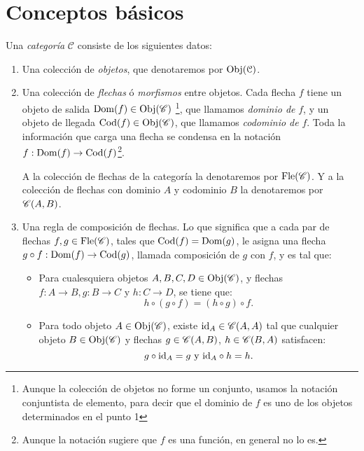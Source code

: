 \documentclass{comunicaciones}
\begin{document}
\section{Conceptos básicos}\label{Conceptos basicos}
\begin{dfn}[Categoría]\label{Definicion categoria}
 Una \emph{categoría} $\mathcal{C}$ consiste de los siguientes datos:
 \begin{enumerate}
        \item Una colección de \emph{objetos}, que denotaremos por $\mathrm{Obj}(\mathcal{C})$.
        \item Una colección de \emph{flechas} ó \emph{morfismos} entre objetos. Cada flecha $f$ tiene un objeto
        de salida $\mathrm{Dom}(f)\in\mathrm{Obj}(\mathscr C)$ \footnote{Aunque la colección de objetos 
        no forme un conjunto, usamos la notación conjuntista de elemento, para decir
        que el dominio de $f$ es uno de los objetos determinados en el punto 1},
        que llamamos \emph{dominio de} $f$, y un objeto de llegada 
        $\mathrm{Cod}(f)\in\mathrm{Obj}(\mathscr C)$, que llamamos \emph{codominio de} $f$. Toda la información
        que carga una flecha se condensa en la notación $f:\mathrm{Dom}(f)\to\mathrm{Cod}(f)$\footnote{
        Aunque la notación sugiere que $f$ es una función, en general no lo es.}. 

        A la colección de flechas de la categoría la denotaremos por $\mathrm{Fle}(\mathscr C)$. Y a la colección 
        de flechas con dominio $A$ y codominio $B$ la denotaremos por $\mathscr C(A,B)$.
        \item Una regla de composición de flechas. Lo que significa que a cada par de flechas $f,g\in\mathrm{Fle}(\mathscr C)$, tales que $\mathrm{Cod}(f)=\mathrm{Dom}(g)$, 
        le asigna una flecha $g\circ f:\mathrm{Dom}(f)\to \mathrm{Cod}(g)$, llamada composición de $g$ con $f$, y es tal que: 

                
        \begin{itemize}
            \item Para cualesquiera objetos $A,B,C,D\in\mathrm{Obj}(\mathscr C)$, y flechas $f:A\to B,g:B\to C$ y $h:C\to D$, se tiene que:
            $$h\circ(g\circ f) = (h\circ g)\circ f.$$
            
            \item Para todo objeto $A\in\mathrm{Obj}(\mathscr C)$, existe $\mathrm{id}_A\in\mathscr C( A,A)$ tal que cualquier objeto $B\in\mathrm{Obj}(\mathscr C)$ y flechas $g\in\mathscr C(A,B)$, $h\in\mathscr C(B,A)$ satisfacen:
            $$g\circ \mathrm{id}_A=g\text{ y }\mathrm{id}_A\circ h=h.$$
        \end{itemize}
 \end{enumerate}
\end{dfn}
\end{document}
